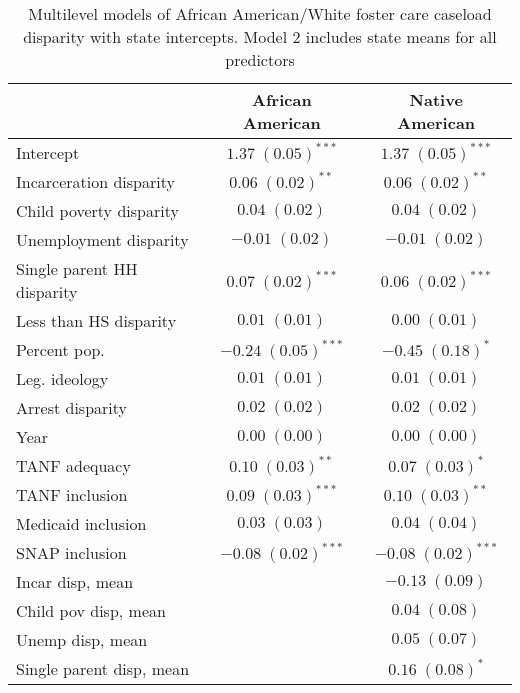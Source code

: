 
\begin{table}
\caption{Multilevel models of African American/White foster care caseload disparity with state intercepts. Model 2 includes state means for all predictors }
\begin{center}
\begin{tabular}{l c c }
\hline
 & African American & Native American \\
\hline
Intercept                  & $1.37 \; (0.05)^{***}$  & $1.37 \; (0.05)^{***}$  \\
Incarceration disparity    & $0.06 \; (0.02)^{**}$   & $0.06 \; (0.02)^{**}$   \\
Child poverty disparity    & $0.04 \; (0.02)$        & $0.04 \; (0.02)$        \\
Unemployment disparity     & $-0.01 \; (0.02)$       & $-0.01 \; (0.02)$       \\
Single parent HH disparity & $0.07 \; (0.02)^{***}$  & $0.06 \; (0.02)^{***}$  \\
Less than HS disparity     & $0.01 \; (0.01)$        & $0.00 \; (0.01)$        \\
Percent pop.               & $-0.24 \; (0.05)^{***}$ & $-0.45 \; (0.18)^{*}$   \\
Leg. ideology              & $0.01 \; (0.01)$        & $0.01 \; (0.01)$        \\
Arrest disparity           & $0.02 \; (0.02)$        & $0.02 \; (0.02)$        \\
Year                       & $0.00 \; (0.00)$        & $0.00 \; (0.00)$        \\
TANF adequacy              & $0.10 \; (0.03)^{**}$   & $0.07 \; (0.03)^{*}$    \\
TANF inclusion             & $0.09 \; (0.03)^{***}$  & $0.10 \; (0.03)^{**}$   \\
Medicaid inclusion         & $0.03 \; (0.03)$        & $0.04 \; (0.04)$        \\
SNAP inclusion             & $-0.08 \; (0.02)^{***}$ & $-0.08 \; (0.02)^{***}$ \\
Incar disp, mean           &                         & $-0.13 \; (0.09)$       \\
Child pov disp, mean       &                         & $0.04 \; (0.08)$        \\
Unemp disp, mean           &                         & $0.05 \; (0.07)$        \\
Single parent disp, mean   &                         & $0.16 \; (0.08)^{*}$    \\

\end{tabular}
\end{center}
\end{table}

